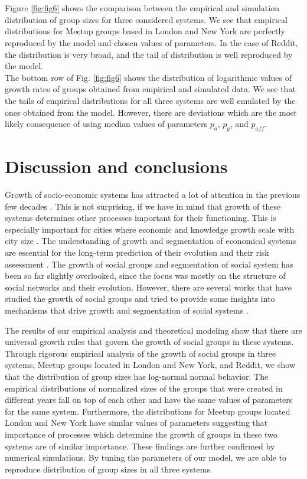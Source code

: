 \\~\\
Figure \ref{fig:fig6} shows the comparison between the empirical and simulation distribution of group sizes for three considered systems. We see that empirical distributions for Meetup groups based in London and New York are perfectly reproduced by the model and chosen values of parameters. In the case of Reddit, the distribution is very broad, and the tail of distribution is well reproduced by the model.\\
The bottom row of Fig. \ref{fig:fig6} shows the distribution of logarithmic values of growth rates of groups obtained from empirical and simulated data. We see that the tails of empirical distributions for all three systems are well emulated by the ones obtained from the model. However, there are deviations which are the most likely consequence of using median values of parameters $p_{a}$, $p_{g}$, and $p_{aff}$.\\


\section{Discussion and conclusions}

Growth of socio-economic systems has attracted a lot of attention in the previous few decades \cite{}. This is not surprising, if we have in mind that growth of these systems determines other processes important for their functioning. This is especially important for cities where economic and knowledge growth scale with city size \cite{bettencourt2007growth}. The understanding of growth and segmentation of economical systems are essential for the long-term prediction of their evolution and their risk assessment \cite{}. The growth of social groups and segmentation of social system has been so far slightly overlooked, since the focus was mostly on the structure of social networks and their evolution. However, there are several works that have studied the growth of social groups and tried to provide some insights into mechanisms that drive growth and segmentation of social systems \cite{}.  

The results of our empirical analysis and theoretical modeling show that there are universal growth rules that govern the growth of social groups in these systems. Through rigorous empirical analysis of the growth of social groups in three systems, Meetup groups located in London and New York, and Reddit, we show that the distribution of group sizes has log-normal normal behavior. The empirical distributions of normalized sizes of the groups that were created in different years fall on top of each other and have the same values of parameters for the same system. Furthermore, the distributions for Meetup groups located London and New York have similar values of parameters suggesting that importance of processes which determine the growth of groups in these two systems are of similar importance. These findings are further confirmed by numerical simulations. By tuning the parameters of our model, we are able to reproduce distribution of group sizes in all three systems.  

